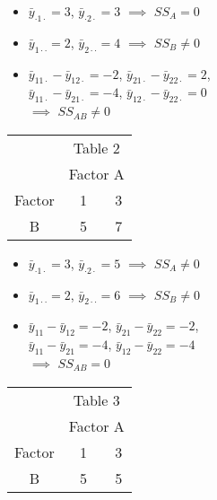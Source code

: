 \documentclass[11pt]{article}
\begin{document}
\begin{enumerate}
\begin{minipage}{0.5\linewidth}
\begin{itemize}
\item \(\bar{y}_{\cdot 1\cdot}=3\), \(\bar{y}_{\cdot 2\cdot}=3\)
\(\implies\) \(SS_A=0\)
\item \(\bar{y}_{1\cdot\cdot}=2\), \(\bar{y}_{2\cdot\cdot}=4\)
\(\implies\) \(SS_B\neq 0\)
\item \(\bar{y}_{11\cdot}-\bar{y}_{12\cdot}=-2\),
\(\bar{y}_{21\cdot}-\bar{y}_{22\cdot}=2\),\\
\(\bar{y}_{11\cdot}-\bar{y}_{21\cdot}=-4\),
\(\bar{y}_{12\cdot}-\bar{y}_{22\cdot}=0\) \\
\(\implies\) \(SS_{AB}\neq 0\)
\end{itemize}

\end{minipage}\begin{minipage}{0.5\linewidth}
\begin{tabular}{c|c|c|}
\multicolumn{1}{c}{} & \multicolumn{2}{c}{Table 2} \\
\multicolumn{1}{c}{} & \multicolumn{2}{c}{Factor A} \\
\cline{2-3}
Factor & ~1~ & 3 \\
\cline{2-3}
B & 5 & 7 \\
\cline{2-3}
\end{tabular}

\begin{itemize}
\item \(\bar{y}_{\cdot 1\cdot}=3\), \(\bar{y}_{\cdot 2\cdot}=5\)
\(\implies\) \(SS_A\neq 0\)
\item \(\bar{y}_{1\cdot\cdot}=2\), \(\bar{y}_{2\cdot\cdot}=6\)
\(\implies\) \(SS_B\neq 0\)
\item \(\bar{y}_{11}-\bar{y}_{12}=-2\), \(\bar{y}_{21}-\bar{y}_{22}=-2\),\\
\(\bar{y}_{11}-\bar{y}_{21}=-4\), \(\bar{y}_{12}-\bar{y}_{22}=-4\) \\
\(\implies\) \(SS_{AB}=0\)
\end{itemize}

\end{minipage}

\begin{minipage}{0.5\linewidth}
\begin{tabular}{c|c|c|}
\multicolumn{1}{c}{} & \multicolumn{2}{c}{Table 3} \\
\multicolumn{1}{c}{} & \multicolumn{2}{c}{Factor A} \\
\cline{2-3}
Factor & ~1~ & 3 \\
\cline{2-3}
B & 5 & 5 \\
\cline{2-3}
\end{tabular}


\end{minipage}
\end{enumerate}
\end{document}
